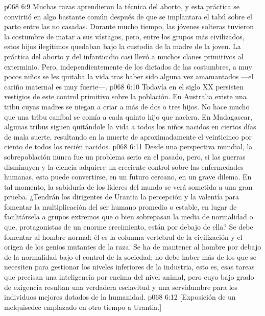 \vs p068 6:9 Muchas razas aprendieron la técnica del aborto, y esta práctica se convirtió en algo bastante común después de que se implantara el tabú sobre el parto entre las no casadas. Durante mucho tiempo, las jóvenes solteras tuvieron la costumbre de matar a sus vástagos, pero, entre los grupos más civilizados, estos hijos ilegítimos quedaban bajo la custodia de la madre de la joven. La práctica del aborto y del infanticidio casi llevó a muchos clanes primitivos al exterminio. Pero, independientemente de los dictados de las costumbres, a muy pocos niños se les quitaba la vida tras haber sido alguna vez amamantados ---el cariño maternal es muy fuerte---.
\vs p068 6:10 Todavía en el siglo XX persisten vestigios de este control primitivo sobre la población. En Australia existe una tribu cuyas madres se niegan a criar a más de dos o tres hijos. No hace mucho que una tribu caníbal se comía a cada quinto hijo que naciera. En Madagascar, algunas tribus siguen quitándole la vida a todos los niños nacidos en ciertos días de mala suerte, resultando en la muerte de aproximadamente el veinticinco por ciento de todos los recién nacidos.
\vs p068 6:11 \pc Desde una perspectiva mundial, la sobrepoblación nunca fue un problema serio en el pasado, pero, si las guerras disminuyen y la ciencia adquiere un creciente control sobre las enfermedades humanas, esta puede convertirse, en un futuro cercano, en un grave dilema. En tal momento, la sabiduría de los líderes del mundo se verá sometida a una gran prueba. ¿Tendrán los dirigentes de Urantia la percepción y la valentía para fomentar la multiplicación del ser humano promedio o estable, en lugar de facilitársela a grupos extremos que o bien sobrepasan la media de normalidad o que, protagonistas de un enorme crecimiento, están por debajo de ella? Se debe fomentar al hombre normal; él es la columna vertebral de la civilización y el origen de los genios mutantes de la raza. Se ha de mantener al hombre por debajo de la normalidad bajo el control de la sociedad; no debe haber más de los que se necesiten para gestionar los niveles inferiores de la industria, esto es, esas tareas que precisan una inteligencia por encima del nivel animal, pero cuyo bajo grado de exigencia resultan una verdadera esclavitud y una servidumbre para los individuos mejores dotados de la humanidad.
\vsetoff
\vs p068 6:12 [Exposición de un melquisedec emplazado en otro tiempo a Urantia.]
